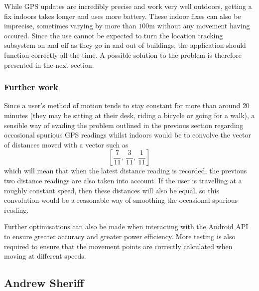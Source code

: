 \documentclass[12pt,a4paper,twoside]{article}
\begin{document}
While GPS updates are incredibly precise and work very well outdoors, getting a fix indoors takes longer and uses more battery. These indoor fixes can also be imprecise, sometimes varying by more than $100$m without any movement having occured. Since the use cannot be expected to turn the location tracking subsystem on and off as they go in and out of buildings, the application should function correctly all the time. A possible solution to the problem is therefore presented in the next section.

\subsubsection{Further work}
Since a user's method of motion tends to stay constant for more than around $20$ minutes (they may be sitting at their desk, riding a bicycle or going for a walk), a sensible way of evading the problem outlined in the previous section regarding occasional spurious GPS readings whilst indoors would be to convolve the vector of distances moved with a vector such as
\[
\left[{ \frac{7}{11},\, \frac{3}{11},\, \frac{1}{11}}\right]
\]
which will mean that when the latest distance reading is recorded, the previous two distance readings are also taken into account. If the user is travelling at a roughly constant speed, then these distances will also be equal, so this convolution would be a reasonable way of smoothing the occasional spurious reading.

Further optimisations can also be made when interacting with the Android API to ensure greater accuracy and greater power efficiency. More testing is also required to ensure that the movement points are correctly calculated when moving at different speeds.

\subsection{Andrew Sheriff}
\end{document}
